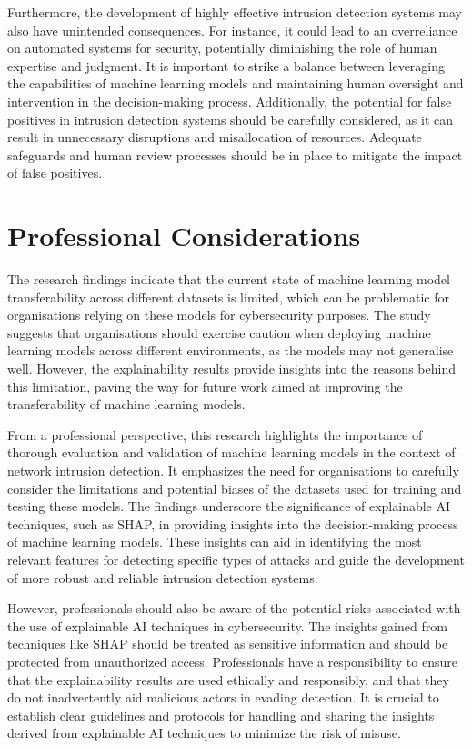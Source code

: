 Furthermore, the development of highly effective intrusion detection systems may also have unintended consequences. For instance, it could lead to an overreliance on automated systems for security, potentially diminishing the role of human expertise and judgment. It is important to strike a balance between leveraging the capabilities of machine learning models and maintaining human oversight and intervention in the decision-making process. Additionally, the potential for false positives in intrusion detection systems should be carefully considered, as it can result in unnecessary disruptions and misallocation of resources. Adequate safeguards and human review processes should be in place to mitigate the impact of false positives.

\section{Professional Considerations}
The research findings indicate that the current state of machine learning model transferability across different datasets is limited, which can be problematic for organisations relying on these models for cybersecurity purposes. The study suggests that organisations should exercise caution when deploying machine learning models across different environments, as the models may not generalise well. However, the explainability results provide insights into the reasons behind this limitation, paving the way for future work aimed at improving the transferability of machine learning models.

From a professional perspective, this research highlights the importance of thorough evaluation and validation of machine learning models in the context of network intrusion detection. It emphasizes the need for organisations to carefully consider the limitations and potential biases of the datasets used for training and testing these models. The findings underscore the significance of explainable AI techniques, such as SHAP, in providing insights into the decision-making process of machine learning models. These insights can aid in identifying the most relevant features for detecting specific types of attacks and guide the development of more robust and reliable intrusion detection systems.

However, professionals should also be aware of the potential risks associated with the use of explainable AI techniques in cybersecurity. The insights gained from techniques like SHAP should be treated as sensitive information and should be protected from unauthorized access. Professionals have a responsibility to ensure that the explainability results are used ethically and responsibly, and that they do not inadvertently aid malicious actors in evading detection. It is crucial to establish clear guidelines and protocols for handling and sharing the insights derived from explainable AI techniques to minimize the risk of misuse.

